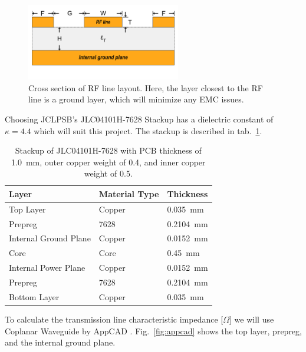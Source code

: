 \begin{figure}[H]
    \centering
    \includegraphics[width=0.6\textwidth]{figures/GCPW.png}
    \caption{Cross section of RF line layout. Here, the layer closest to the RF line is a ground layer, which will minimize any EMC issues.}
    \label{fig:gcpw}
\end{figure}

Choosing JCLPSB's JLC04101H-7628 Stackup has a dielectric constant of $\kappa = 4.4$ which will suit this project. The stackup is described in tab.~\ref{tab:pcb_stackup}.

\begin{table}[H]
    \centering
    \caption{Stackup of JLC04101H-7628 with PCB thickness of \SI{1.0}{\milli\meter}, outer copper weight of \SI{0.4}{\ounce}, and inner copper weight of \SI{0.5}{\ounce}\protect\footnotemark.}
    \label{tab:pcb_stackup}
    \begin{tabular}{lll}
    \textbf{Layer} & \textbf{Material Type} & \textbf{Thickness} \\ \hline
    Top Layer & \cellcolor{copper_green}Copper & \SI{0.035}{\milli\meter} \\
    Prepreg & 7628 & \SI{0.2104}{\milli\meter} \\
    Internal Ground Plane & \cellcolor{copper_green}Copper & \SI{0.0152}{\milli\meter} \\
    Core & \cellcolor{core_yellow}Core & \SI{0.45}{\milli\meter} \\
    Internal Power Plane & \cellcolor{copper_green}Copper & \SI{0.0152}{\milli\meter} \\
    Prepreg & 7628 & \SI{0.2104}{\milli\meter} \\
    Bottom Layer & \cellcolor{copper_green}Copper & \SI{0.035}{\milli\meter}
    \end{tabular}
\end{table}

To calculate the transmission line characteristic impedance [$\Omega$] we will use Coplanar Waveguide by AppCAD . Fig.~\ref{fig:appcad} shows the top layer, prepreg, and the internal ground plane.

